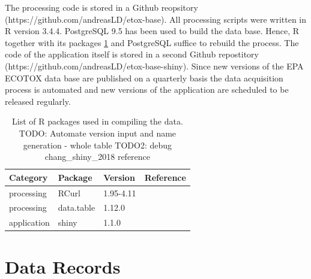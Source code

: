 \documentclass[english]{article}
\newcommand{\git}{https://github.com/andreasLD/etox-base}
\newcommand{\gitapp}{https://github.com/andreasLD/etox-base-shiny}
\begin{document}
The processing code is stored in a Github reopsitory (\git{}). All processing scripts were written in R version 3.4.4. PostgreSQL 9.5 has been used to build the data base. Hence, R together with its packages \ref{tab:rpackages} and PostgreSQL suffice to rebuild the process. The code of the application itself is stored in a second Github repostitory (\gitapp{}). Since new versions of the EPA ECOTOX data base are published on a quarterly basis the data acquisition process is automated and new versions of the application are scheduled to be released regularly.

\begin{table}[h!]
    \centering
    \begin{tabular}{|l|l|l|l|}
        \hline
        Category        & Package       & Version   & Reference                     \\ \hline
        processing      & RCurl         & 1.95-4.11 & \citep{lang_rcurl_2018}       \\ \hline
        processing      & data.table    & 1.12.0    & \citep{dowle_data.table_2018} \\ \hline
        application     & shiny         & 1.1.0     & \citep{chang_shiny_2018}      \\ \hline
    \end{tabular}
    \caption{List of R packages used in compiling the data.\newline{}
    TODO: Automate version input and name generation - whole table\newline{}
    TODO2: debug chang\_shiny\_2018 reference}
    \label{tab:rpackages}
\end{table}



\section*{Data Records}
\end{document}
